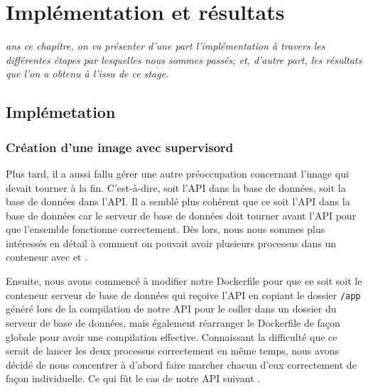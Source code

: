 \let\textcircled=\pgftextcircled
\chapter{Impl\'ementation et r\'esultats}
\label{chap:implementation}

\textit{ans ce chapitre, on va présenter d'une part l'implémentation à travers les différentes étapes par lesquelles nous sommes passés; et, d'autre part, les résultats que l'on a obtenu à l'issu de ce stage.  }

\minitoc
{}
\newpage

\section{Impl\'emetation}
\subsection{Cr\'eation d'une image avec supervisord}
Plus tard, il a aussi fallu g\'erer une autre pr\'eoccupation concernant l'image qui devait tourner \`a la fin. C'est-\`a-dire, soit l'API dans la base de donn\'ees, soit la base de donn\'ees dans l'API. Il a sembl\'e plus coh\'erent que ce soit l'API dans la base de donn\'ees car le serveur de base 
de donn\'ees doit tourner avant l'API pour que l'ensemble fonctionne correctement. D\`es lors, nous nous sommes plus int\'eress\'es en d\'etail \`a comment on pouvait avoir plusieurs processus dans un conteneur avec \cite{postgres-supervisord} et \cite{multiple-services-docker}.

Ensuite, nous avons commenc\'e \`a modifier notre Dockerfile pour que ce soit soit le conteneur serveur de base de donn\'ees qui re\c{c}oive l'API en copiant le dossier \lstinline{/app} g\'en\'er\'e lors de la compilation de notre API pour le coller dans un dossier du serveur de base de donn\'ees, mais \'egalement 
r\'earranger le Dockerfile de fa\c{c}on globale pour avoir une compilation effective. Connaissant la difficult\'e que ce serait de lancer les deux processus correctement en m\^eme temps, nous avons d\'ecid\'e de nous concentrer \`a d'abord faire marcher chacun d'eux correctement de fa\c{c}on individuelle. 
Ce qui f\^ut le cas de notre API suivant \cite{node-supervisor}.

